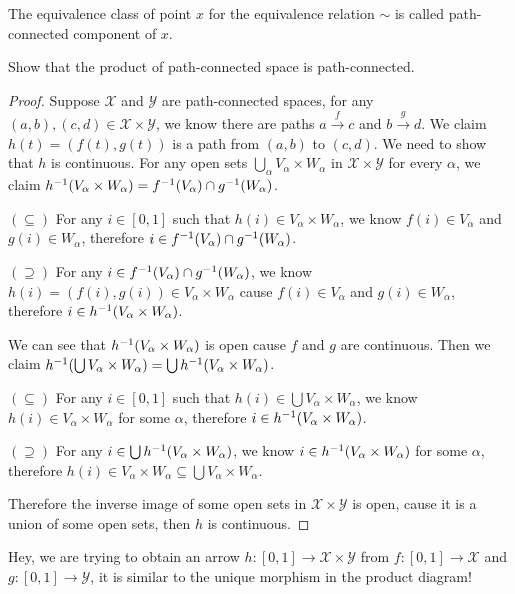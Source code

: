 \documentclass[./main.tex]{subfiles}
\begin{document}
The equivalence class of point $x$ for the equivalence relation $\sim$
is called path-connected component of $x$.

\begin{theorem}
  Show that the product of path-connected space is path-connected.
\end{theorem}
\begin{proof}
  Suppose $\mathcal{X}$ and $\mathcal{Y}$ are path-connected spaces,
  for any $(a, b), (c, d) \in \mathcal{X} \times \mathcal{Y}$, we
  know there are paths $a \xrightarrow{f} c$ and $b \xrightarrow{g} d$.
  We claim $h(t) = (f(t), g(t))$ is a path from $(a, b)$ to $(c, d)$.
  We need to show that $h$ is continuous.
  For any open sets $\bigcup_\alpha V_\alpha \times W_\alpha$ in $\mathcal{X} \times \mathcal{Y}$
  for every $\alpha$, we claim $h^{-1}(V_\alpha \times W_\alpha) = f^{-1}(V_\alpha) \cap g^{-1}(W_\alpha)$.
  
  $(\subseteq)$ For any $i \in [0, 1]$ such that $h(i) \in V_\alpha \times W_\alpha$,
  we know $f(i) \in V_\alpha$ and $g(i) \in W_\alpha$, therefore $i \in f^{-1}(V_\alpha) \cap g^{-1}(W_\alpha)$.

  $(\supseteq)$ For any $i \in f^{-1}(V_\alpha) \cap g^{-1}(W_\alpha)$, we know
  $h(i) = (f(i), g(i)) \in V_\alpha \times W_\alpha$ cause $f(i) \in V_\alpha$
  and $g(i) \in W_\alpha$, therefore $i \in h^{-1}(V_\alpha \times W_\alpha)$.

  We can see that $h^{-1}(V_\alpha \times W_\alpha)$ is open cause $f$ and $g$ are continuous.
  Then we claim $h^{-1}(\bigcup V_\alpha \times W_\alpha) = \bigcup h^{-1}(V_\alpha \times W_\alpha)$.
  
  $(\subseteq)$ For any $i \in [0, 1]$ such that $h(i) \in \bigcup V_\alpha \times W_\alpha$,
  we know $h(i) \in V_\alpha \times W_\alpha$ for some $\alpha$, therefore 
  $i \in h^{-1}(V_\alpha \times W_\alpha)$.

  $(\supseteq)$ For any $i \in \bigcup h^{-1}(V_\alpha \times W_\alpha)$, we know
  $i \in h^{-1}(V_\alpha \times W_\alpha)$ for some $\alpha$, therefore 
  $h(i) \in V_\alpha \times W_\alpha \subseteq \bigcup V_\alpha \times W_\alpha$.

  Therefore the inverse image of some open sets in $\mathcal{X} \times \mathcal{Y}$ is open,
  cause it is a union of some open sets, then $h$ is continuous.
\end{proof}

Hey, we are trying to obtain an arrow $h : [0, 1] \rightarrow \mathcal{X} \times \mathcal{Y}$
from $f : [0, 1] \rightarrow \mathcal{X}$ and $g : [0, 1] \rightarrow \mathcal{Y}$,
it is similar to the unique morphism in the product diagram!
\end{document}
